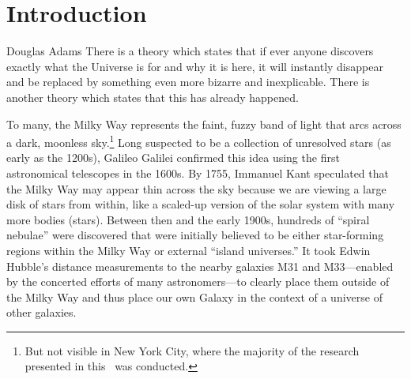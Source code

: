 \chapter[Introduction]{Introduction} \label{ch:intro}




\vspace{-16pt} \begin{chapquote}{Douglas Adams} \singlespacing There is a theory
which states that if ever anyone discovers exactly what the Universe is for and
why it is here, it will instantly disappear and be replaced by something even
more bizarre and inexplicable. There is another theory which states that this
has already happened. \end{chapquote} \vspace{-8pt}
\noindent\makebox[\linewidth]{\rule{0.5\textwidth}{0.5pt}} \vspace{1pt}

To many, the Milky Way represents the faint, fuzzy band of light that arcs
across a dark, moonless sky.\footnote{But not visible in New York City, where
the majority of the research presented in this \article\ was conducted.} Long
suspected to be a collection of unresolved stars (as early as the 1200s),
Galileo Galilei confirmed this idea using the first astronomical telescopes in
the 1600s. By 1755, Immanuel Kant speculated that the Milky Way may appear thin
across the sky because we are viewing a large disk of stars from within, like a
scaled-up version of the solar system with many more bodies (stars). Between
then and the early 1900s, hundreds of ``spiral nebulae'' were discovered that
were initially believed to be either star-forming regions within the Milky Way
or external ``island universes.'' It took Edwin Hubble's distance measurements
to the nearby galaxies M31 and M33---enabled by the concerted efforts of many
astronomers---to clearly place them outside of the Milky Way and thus place our
own Galaxy in the context of a universe of other galaxies.

